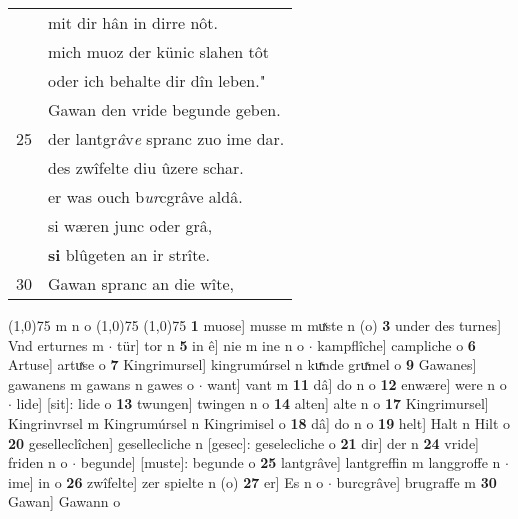 \documentclass[8pt,a4paper,notitlepage]{article}
\begin{document}
\begin{table}[ht]
\begin{minipage}[t]{0.5\linewidth}
\begin{tabular}{rl}
 & mit dir hân in dirre nôt.\\ 
 & mich muoz der künic slahen tôt\\ 
 & oder ich behalte dir dîn leben."\\ 
 & Gawan den vride begunde geben.\\ 
25 & der lantgr\textit{â}v\textit{e} spranc zuo ime dar.\\ 
 & des zwîfelte diu ûzere schar.\\ 
 & er was ouch b\textit{ur}cgrâve aldâ.\\ 
 & si wæren junc oder grâ,\\ 
 & \textbf{si} blûgeten an ir strîte.\\ 
30 & Gawan spranc an die wîte,\\ 
\end{tabular}
\scriptsize
\line(1,0){75} \newline
m n o \newline
\line(1,0){75} \newline
\newline
\line(1,0){75} \newline
\textbf{1} muose] musse m muͯste n (o) \textbf{3} under des turnes] Vnd erturnes m  $\cdot$ tür] tor n \textbf{5} in ê] nie m ine n o  $\cdot$ kampflîche] campliche o \textbf{6} Artuse] artuͯse o \textbf{7} Kingrimursel] kingrumúrsel n kuͯnde gruͯmel o \textbf{9} Gawanes] gawanens m gawans n gawes o  $\cdot$ want] vant m \textbf{11} dâ] do n o \textbf{12} enwære] were n o  $\cdot$ lide] [sit]: lide o \textbf{13} twungen] twingen n o \textbf{14} alten] alte n o \textbf{17} Kingrimursel] Kingrinvrsel m Kingrumúrsel n Kingrimisel o \textbf{18} dâ] do n o \textbf{19} helt] Halt n Hilt o \textbf{20} geselleclîchen] gesellecliche n [gesec]: geselecliche o \textbf{21} dir] der n \textbf{24} vride] friden n o  $\cdot$ begunde] [muste]: begunde o \textbf{25} lantgrâve] lantgreffin m langgroffe n  $\cdot$ ime] in o \textbf{26} zwîfelte] zer spielte n (o) \textbf{27} er] Es n o  $\cdot$ burcgrâve] brugraffe m \textbf{30} Gawan] Gawann o \newline
\end{minipage}
\end{table}
\newpage
\end{document}
